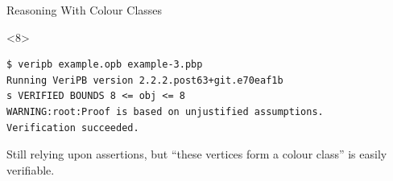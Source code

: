 \documentclass[aspectratio=169,compress,10pt]{beamer}
\begin{document}
\begin{frame}[fragile,t]{Reasoning With Colour Classes}
\begin{onlyenv}
%
\end{onlyenv}\begin{onlyenv}<8>%
\begin{Verbatim}
$ veripb example.opb example-3.pbp
Running VeriPB version 2.2.2.post63+git.e70eaf1b
s VERIFIED BOUNDS 8 <= obj <= 8
WARNING:root:Proof is based on unjustified assumptions.
Verification succeeded.
\end{Verbatim}

\bigskip

Still relying upon assertions, but ``these vertices form a colour class'' is easily verifiable.
\end{onlyenv}
\end{frame}
\end{document}
